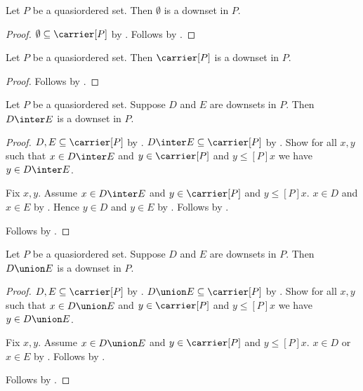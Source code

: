 \begin{proposition}\label{emptyset_is_downset}
    Let $P$ be a quasiordered set.
    Then $\emptyset$ is a downset in $P$.
\end{proposition}
\begin{proof}
    $\emptyset\subseteq\carrier[P]$ by .
    Follows by .
\end{proof}

\begin{proposition}\label{carrier_is_downset}
    Let $P$ be a quasiordered set.
    Then $\carrier[P]$ is a downset in $P$.
\end{proposition}
\begin{proof}
    Follows by .
\end{proof}

\begin{proposition}\label{downset_inter}
    Let $P$ be a quasiordered set.
    Suppose $D$ and $E$ are downsets in $P$.
    Then $D\inter E$ is a downset in $P$.
\end{proposition}
\begin{proof}
    $D,E\subseteq\carrier[P]$ by .
    $D\inter E\subseteq\carrier[P]$ by
        .
    Show for all $x,y$ such that $x\in D\inter E$ and
        $y\in\carrier[P]$ and $y\mathrel{\leq[P]}x$ we have
        $y\in D\inter E$.
    \begin{subproof}
        Fix $x,y$.
        Assume $x\in D\inter E$ and $y\in\carrier[P]$ and
            $y\mathrel{\leq[P]}x$.
        $x\in D$ and $x\in E$ by
            .
        Hence $y\in D$ and $y\in E$ by
            .
        Follows by .
    \end{subproof}
    Follows by .
\end{proof}

\begin{proposition}\label{downset_union}
    Let $P$ be a quasiordered set.
    Suppose $D$ and $E$ are downsets in $P$.
    Then $D\union E$ is a downset in $P$.
\end{proposition}
\begin{proof}
    $D,E\subseteq\carrier[P]$ by .
    $D\union E\subseteq\carrier[P]$ by
        .
    Show for all $x,y$ such that $x\in D\union E$ and
        $y\in\carrier[P]$ and $y\mathrel{\leq[P]}x$ we have
        $y\in D\union E$.
    \begin{subproof}
        Fix $x,y$.
        Assume $x\in D\union E$ and $y\in\carrier[P]$ and
            $y\mathrel{\leq[P]}x$.
        $x\in D$ or $x\in E$ by .
        Follows by .
    \end{subproof}
    Follows by .
\end{proof}

